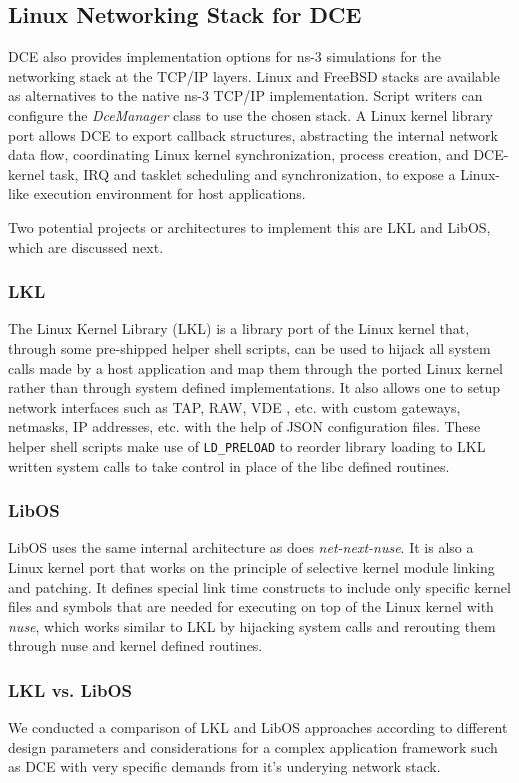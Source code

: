 \documentclass{sig-alternate}
\begin{document}
\subsection{Linux Networking Stack for DCE}
DCE also provides implementation options for ns-3 simulations for the networking stack at the TCP/IP layers.  
Linux and FreeBSD stacks are available as alternatives to the native ns-3 TCP/IP implementation.
Script writers can configure the \textit{DceManager} class to use the chosen stack.
A Linux kernel library port allows DCE to export callback structures, abstracting the internal network data flow, coordinating Linux kernel synchronization, 
process creation, and DCE-kernel task, IRQ and tasklet scheduling and synchronization, to expose a Linux-like execution environment for host applications. 

Two potential projects or architectures to implement this are LKL and LibOS, which are discussed next.

\subsubsection{LKL}
The Linux Kernel Library (LKL) is a library port of the Linux kernel that, through some pre-shipped helper shell scripts, can be used to hijack
all system calls made by a host application and map them through the ported Linux kernel rather than through system defined implementations. It also allows one 
to setup network interfaces such as TAP, RAW, VDE , etc. with custom gateways, netmasks, IP addresses, etc. with the help of JSON configuration files. These helper
shell scripts make use of \texttt{LD\_PRELOAD} to reorder library loading to LKL written system calls to take control in place of the libc defined routines.
 
\subsubsection{LibOS}
LibOS uses the same internal architecture as does \textit{net-next-nuse}.
It is also a Linux kernel port that works on the principle of selective 
kernel module linking and patching. It defines special link time constructs
to include only specific kernel files and 
symbols that are needed for executing on top of the Linux kernel with \textit{nuse}, which works similar to LKL by hijacking system calls 
and rerouting them through nuse and kernel defined routines.

\subsubsection{LKL vs. LibOS}
We conducted a comparison of LKL and LibOS approaches according to different design parameters and considerations for a complex application framework such as
DCE with very specific demands from it's underying network stack.
\end{document}
